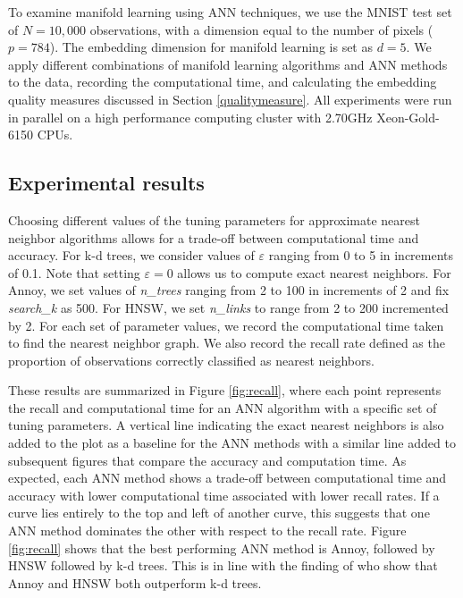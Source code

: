 \documentclass[11pt,a4paper,]{article}
\begin{document}
To examine manifold learning using ANN techniques, we use the MNIST test set of \(N=10,000\) observations, with a dimension equal to the number of pixels (\(p=784\)). The embedding dimension for manifold learning is set as \(d=5\). We apply different combinations of manifold learning algorithms and ANN methods to the data, recording the computational time, and calculating the embedding quality measures discussed in Section \ref{qualitymeasure}. All experiments were run in parallel on a high performance computing cluster with 2.70GHz Xeon-Gold-6150 CPUs.

\hypertarget{mnistresults}{%
\subsection{Experimental results}\label{mnistresults}}

Choosing different values of the tuning parameters for approximate nearest neighbor algorithms allows for a trade-off between computational time and accuracy. For k-d trees, we consider values of \(\varepsilon\) ranging from 0 to 5 in increments of 0.1. Note that setting \(\varepsilon=0\) allows us to compute exact nearest neighbors. For Annoy, we set values of \textit{n\_trees} ranging from 2 to 100 in increments of 2 and fix \textit{search\_k} as 500. For HNSW, we set \textit{n\_links} to range from 2 to 200 incremented by 2. For each set of parameter values, we record the computational time taken to find the nearest neighbor graph. We also record the recall rate defined as the proportion of observations correctly classified as nearest neighbors.

These results are summarized in Figure \ref{fig:recall}, where each point represents the recall and computational time for an ANN algorithm with a specific set of tuning parameters.
A vertical line indicating the exact nearest neighbors is also added to the plot as a baseline for the ANN methods with a similar line added to subsequent figures that compare the accuracy and computation time. As expected, each ANN method shows a trade-off between computational time and accuracy with lower computational time associated with lower recall rates. If a curve lies entirely to the top and left of another curve, this suggests that one ANN method dominates the other with respect to the recall rate. Figure \ref{fig:recall} shows that the best performing ANN method is Annoy, followed by HNSW followed by k-d trees. This is in line with the finding of \textcite{Aumuller2020-nk} who show that Annoy and HNSW both outperform k-d trees.
\end{document}
